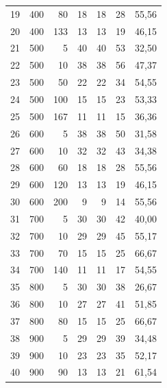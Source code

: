 \documentclass[12pt,a4paper]{article}
\begin{document}
\begin{table}[H]
\begin{tabular}{rrrrrrr}
19 & 400 & 80  & 18  & 18  & 28  & 55,56 \\
20 & 400 & 133 & 13  & 13  & 19  & 46,15 \\
21 & 500 & 5   & 40  & 40  & 53  & 32,50 \\
22 & 500 & 10  & 38  & 38  & 56  & 47,37 \\
23 & 500 & 50  & 22  & 22  & 34  & 54,55 \\
24 & 500 & 100 & 15  & 15  & 23  & 53,33 \\
25 & 500 & 167 & 11  & 11  & 15  & 36,36 \\
26 & 600 & 5   & 38  & 38  & 50  & 31,58 \\
27 & 600 & 10  & 32  & 32  & 43  & 34,38 \\
28 & 600 & 60  & 18  & 18  & 28  & 55,56 \\
29 & 600 & 120 & 13  & 13  & 19  & 46,15 \\
30 & 600 & 200 & 9   & 9   & 14  & 55,56 \\
31 & 700 & 5   & 30  & 30  & 42  & 40,00 \\
32 & 700 & 10  & 29  & 29  & 45  & 55,17 \\
33 & 700 & 70  & 15  & 15  & 25  & 66,67 \\
34 & 700 & 140 & 11  & 11  & 17  & 54,55 \\
35 & 800 & 5   & 30  & 30  & 38  & 26,67 \\
36 & 800 & 10  & 27  & 27  & 41  & 51,85 \\
37 & 800 & 80  & 15  & 15  & 25  & 66,67 \\
38 & 900 & 5   & 29  & 29  & 39  & 34,48 \\
39 & 900 & 10  & 23  & 23  & 35  & 52,17 \\
40 & 900 & 90  & 13  & 13  & 21  & 61,54 \\
\bottomrule
\end{tabular}
\end{table}
\end{document}
